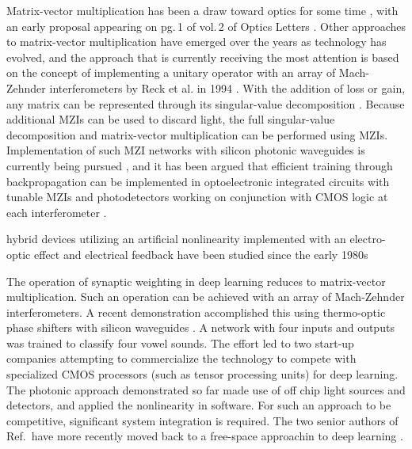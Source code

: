 Matrix-vector multiplication has been a draw toward optics for some time \cite{godi1978,ve1984,maar1987}, with an early proposal appearing on pg.\,1 of vol.\,2 of Optics Letters \cite{godi1978}. Other approaches to matrix-vector multiplication have emerged over the years as technology has evolved, and the approach that is currently receiving the most attention is based on the concept of implementing a unitary operator with an array of Mach-Zehnder interferometers by Reck et al. in 1994 \cite{reze1994}. With the addition of loss or gain, any matrix can be represented through its singular-value decomposition \cite{st2016}. Because additional MZIs can be used to discard light, the full singular-value decomposition and matrix-vector multiplication can be performed using MZIs. Implementation of such MZI networks with silicon photonic waveguides is currently being pursued \cite{mi2015_fix_ref,shha2017}, and it has been argued that efficient training through backpropagation can be implemented in optoelectronic integrated circuits with tunable MZIs and photodetectors working on conjunction with CMOS logic at each interferometer \cite{humi2018}.

hybrid devices utilizing an artificial nonlinearity implemented with an electro-optic effect and electrical feedback have been studied since the early 1980s \cite{sm1980,ko1981}

The operation of synaptic weighting in deep learning reduces to matrix-vector multiplication. Such an operation can be achieved with an array of Mach-Zehnder interferometers. A recent demonstration accomplished this using thermo-optic phase shifters with silicon waveguides \cite{shha2016}. A network with four inputs and outputs was trained to classify four vowel sounds. The effort led to two start-up companies attempting to commercialize the technology to compete with specialized CMOS processors (such as tensor processing units) for deep learning. The photonic approach demonstrated so far made use of off chip light sources and detectors, and applied the nonlinearity in software. For such an approach to be competitive, significant system integration is required. The two senior authors of Ref.\,\cite{shha2016} have more recently moved back to a free-space approachin to deep learning \cite{}.


